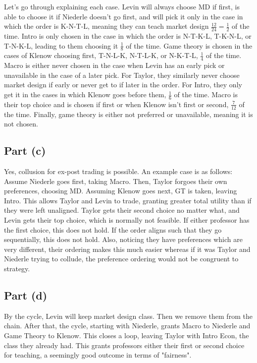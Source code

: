 \documentclass[10pt,a4paper]{article}
\begin{document}
    Let's go through explaining each case. Levin will always choose MD if first, is able to choose it if Niederle doesn't go first, and will pick it only in the case in which the order is K-N-T-L, meaning they can teach market design $\frac{12}{24} = \frac{1}{2}$ of the time. Intro is only chosen in the case in which the order is N-T-K-L, T-K-N-L, or T-N-K-L, leading to them choosing it $\frac{1}{8}$ of the time. Game theory is chosen in the cases of Klenow choosing first, T-N-L-K, N-T-L-K, or N-K-T-L, $\frac{1}{4}$ of the time. Macro is either never chosen in the case when Levin has an early pick or unavailable in the case of a later pick. For Taylor, they similarly never choose market design if early or never get to if later in the order. For Intro, they only get it in the cases in which Klenow goes before them, $\frac{1}{6}$ of the time. Macro is their top choice and is chosen if first or when Klenow isn't first or second, $\frac{7}{12}$ of the time. Finally, game theory is either not preferred or unavailable, meaning it is not chosen. 
  \subsection*{Part (c)}
    Yes, collusion for ex-post trading is possible. An example case is as follows: Assume Niederle goes first, taking Macro. Then, Taylor forgoes their own preferences, choosing MD. Assuming Klenow goes next, GT is taken, leaving Intro. This allows Taylor and Levin to trade, granting greater total utility than if they were left unaligned. Taylor gets their second choice no matter what, and Levin gets their top choice, which is normally not feasible. If either professor has the first choice, this does not hold. If the order aligns such that they go sequentially, this does not hold. Also, noticing they have preferences which are very different, their ordering makes this much easier whereas if it was Taylor and Niederle trying to collude, the preference ordering would not be congruent to strategy.
    
  \subsection*{Part (d)}
    By the cycle, Levin will keep market design class. Then we remove them from the chain. After that, the cycle, starting with Niederle, grants Macro to Niederle and Game Theory to Klenow. This closes a loop, leaving Taylor with Intro Econ, the class they already had. This grants professors either their first or second choice for teaching, a seemingly good outcome in terms of "fairness".
\end{document}
